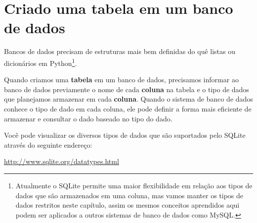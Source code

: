 \section{Criado uma tabela em um banco de dados}


Bancos de dados precisam de estruturas mais bem definidas do quê listas ou
dicionários em Python\footnote{Atualmente o SQLite permite uma maior
  flexibilidade em relação aos tipos de dados que são armazenados em uma
  coluna, mas vamos manter os tipos de dados restritos neste capítulo, assim
  os mesmos conceitos aprendidos aqui podem ser aplicados a outros sistemas
  de banco de dados como MySQL.}.


Quando criamos uma {\bf tabela} em um banco de dados, precisamos informar ao
banco de dados previamente o nome de cada {\bf coluna} na tabela e o tipo de
dados que planejamos armazenar em cada {\bf coluna}. Quando o sistema de
banco de dados conhece o tipo de dado em cada coluna, ele pode definir a
forma mais eficiente de armazenar e consultar o dado baseado no tipo do dado.


Você pode visualizar os diversos tipos de dados que são suportados pelo SQLite
através do seguinte endereço:

\url{http://www.sqlite.org/datatypes.html}



